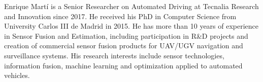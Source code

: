 \documentclass[journal]{IEEEtran}
\begin{document}

%
%
%






% 


\begin{IEEEbiography}
    {Enrique Mart\'i} is a Senior Researcher on Automated Driving at Tecnalia 
    Research and Innovation since 2017. He received his PhD in Computer Science 
    from University Carlos III de Madrid in 2015. 
    He has more than 10 years of experience in Sensor Fusion and Estimation,
    including participation in R\&D projects and creation of commercial 
    sensor fusion products for UAV/UGV navigation and surveillance systems.
    His research interests include sensor technologies, information fusion,
    machine learning and optimization applied to
    automated vehicles.    
\end{IEEEbiography}
\end{document}
